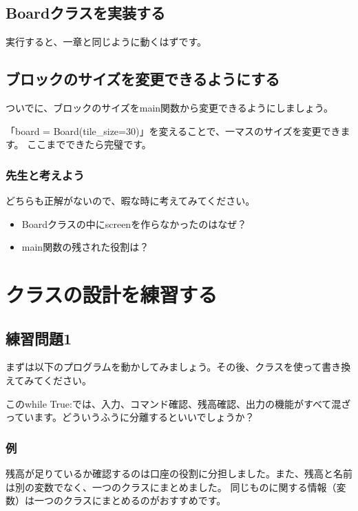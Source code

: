 \documentclass[12pt, a4paper, dvipdfmx]{book}
\begin{document}
\subsection{Boardクラスを実装する}

実行すると、一章と同じように動くはずです。

\subsection{ブロックのサイズを変更できるようにする}
ついでに、ブロックのサイズをmain関数から変更できるようにしましょう。


「{board = Board(tile\_size=30)}」を変えることで、一マスのサイズを変更できます。
ここまでできたら完璧です。

\subsubsection{先生と考えよう}
どちらも正解がないので、暇な時に考えてみてください。
\begin{itemize}
  \item Boardクラスの中にscreenを作らなかったのはなぜ？
  \item main関数の残された役割は？
\end{itemize}

\newpage
\section{クラスの設計を練習する}
\subsection{練習問題1}
まずは以下のプログラムを動かしてみましょう。その後、クラスを使って書き換えてみてください。

このwhile True:では、入力、コマンド確認、残高確認、出力の機能がすべて混ざっています。どういうふうに分離するといいでしょうか？
\newpage
\subsubsection{例}

残高が足りているか確認するのは口座の役割に分担しました。また、残高と名前は別の変数でなく、一つのクラスにまとめました。
同じものに関する情報（変数）は一つのクラスにまとめるのがおすすめです。
\end{document}
